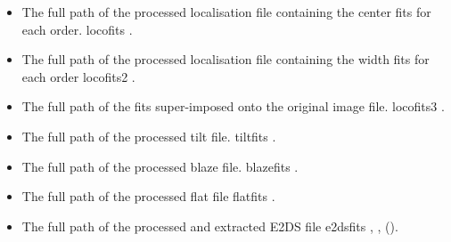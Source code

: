 \begin{itemize}
	\item {} 
	{The full path of the processed localisation file containing the center fits for each order.}
	{locofits}
	{\callocRAW}{\spirouConst.}{\callocRAW}
\end{itemize}

\begin{itemize}
	\item {} 
	{The full path of the processed localisation file containing the width fits for each order}
	{locofits2}
	{\callocRAW}{\spirouConst.}{\callocRAW}
\end{itemize}

\begin{itemize}
	\item {} 
	{The full path of the fits super-imposed onto the original image file.}
	{locofits3}
	{\callocRAW}{\spirouConst.}{\callocRAW}
\end{itemize}

\begin{itemize}
	\item {} 
	{The full path of the processed tilt file.}
	{tiltfits}
	{\calSLIT}{\spirouConst.}{\calSLIT}
\end{itemize}

\begin{itemize}
	\item {} 
	{The full path of the processed blaze file.}
	{blazefits}
	{\calFFraw}{\spirouConst.}{\calFFraw}
\end{itemize}


\begin{itemize}
	\item {} 
	{The full path of the processed flat file}
	{flatfits}
	{\calFFraw}{\spirouConst.}{\calFFraw}
\end{itemize}


\begin{itemize}
	\item {} 
	{The full path of the processed and extracted E2DS file}
	{e2dsfits}
	{\calextractRAW, \calextractRAWAB, \calextractRAWC()}{\spirouConst.}{\calextractRAW}
\end{itemize}


